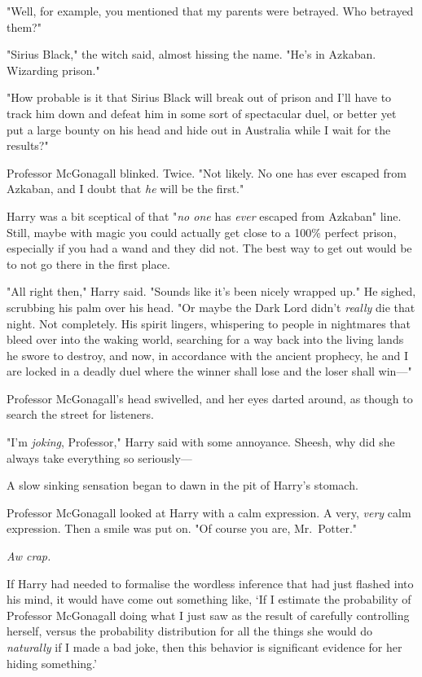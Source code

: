 "Well, for example, you mentioned that my parents were betrayed. Who betrayed 
them?"

"Sirius Black," the witch said, almost hissing the name. "He's in Azkaban. 
Wizarding prison."

"How probable is it that Sirius Black will break out of prison and I'll have to 
track him down and defeat him in some sort of spectacular duel, or better yet 
put a large bounty on his head and hide out in Australia while I wait for the 
results?"

Professor McGonagall blinked. Twice. "Not likely. No one has ever escaped from 
Azkaban, and I doubt that \emph{he} will be the first."

Harry was a bit sceptical of that "\emph{no one} has \emph{ever} escaped from 
Azkaban" line. Still, maybe with magic you could actually get close to a 100\% 
perfect prison, especially if you had a wand and they did not. The best way to 
get out would be to not go there in the first place.

"All right then," Harry said. "Sounds like it's been nicely wrapped up." He 
sighed, scrubbing his palm over his head. "Or maybe the Dark Lord didn't 
\emph{really} die that night. Not completely. His spirit lingers, whispering to 
people in nightmares that bleed over into the waking world, searching for a way 
back into the living lands he swore to destroy, and now, in accordance with the 
ancient prophecy, he and I are locked in a deadly duel where the winner shall 
lose and the loser shall win---"

Professor McGonagall's head swivelled, and her eyes darted around, as though to 
search the street for listeners.

"I'm \emph{joking}, Professor," Harry said with some annoyance. Sheesh, why did 
she always take everything so seriously---

A slow sinking sensation began to dawn in the pit of Harry's stomach.

Professor McGonagall looked at Harry with a calm expression. A very, 
\emph{very} calm expression. Then a smile was put on. "Of course you are, 
Mr.~Potter."

\emph{Aw crap.}

If Harry had needed to formalise the wordless inference that had just flashed 
into his mind, it would have come out something like, `If I estimate the 
probability of Professor McGonagall doing what I just saw as the result of 
carefully controlling herself, versus the probability distribution for all the 
things she would do \emph{naturally} if I made a bad joke, then this behavior 
is significant evidence for her hiding something.'

